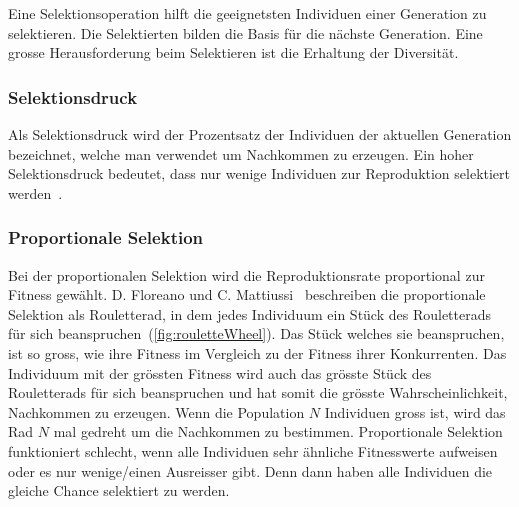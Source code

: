       Eine Selektionsoperation hilft die geeignetsten Individuen einer Generation zu selektieren.
      Die Selektierten bilden die Basis für die nächste Generation.
      Eine grosse Herausforderung beim Selektieren ist die Erhaltung der Diversität.

      \subsubsection{Selektionsdruck\label{subsub:SelectionPressure}}

        Als Selektionsdruck wird der Prozentsatz der Individuen der aktuellen Generation bezeichnet,
        welche man verwendet um Nachkommen zu erzeugen.
        Ein hoher Selektionsdruck bedeutet,
        dass nur wenige Individuen zur Reproduktion selektiert werden~\cite[S.23]{book:bioInspired}.

      \subsubsection{Proportionale Selektion}

        Bei der proportionalen Selektion wird die Reproduktionsrate proportional zur Fitness gewählt.
        D. Floreano und C. Mattiussi~\cite[S.23]{book:bioInspired} beschreiben die proportionale Selektion als Rouletterad,
        in dem jedes Individuum ein Stück des Rouletterads für sich beanspruchen~(\vref{fig:rouletteWheel}).
        Das Stück welches sie beanspruchen, ist so gross,
        wie ihre Fitness im Vergleich zu der Fitness ihrer Konkurrenten.
        Das Individuum mit der grössten Fitness wird auch das grösste Stück des Rouletterads für sich beanspruchen und hat somit die grösste Wahrscheinlichkeit, Nachkommen zu erzeugen.
        Wenn die Population \(N\) Individuen gross ist, wird das Rad \(N\) mal gedreht um die Nachkommen zu bestimmen.
        Proportionale Selektion funktioniert schlecht,
        wenn alle Individuen sehr ähnliche Fitnesswerte aufweisen oder es nur wenige/einen Ausreisser gibt.
        Denn dann haben alle Individuen die gleiche Chance selektiert zu werden.

